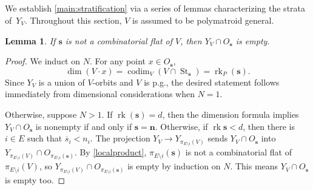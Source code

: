 \documentclass[11pt]{article}
\newtheorem{lemm}[theo]{Lemma}
\theoremstyle{definition}
\numberwithin{equation}{section}
\DeclareMathOperator{\St}{St}
\DeclareMathOperator{\rk}{rk}
\DeclareMathOperator{\codim}{codim}
\begin{document}
\subsection{}\label{geomproofs}
We establish \cref{main:stratification} via a series of lemmas characterizing the strata of~$Y_V$.
Throughout this section, $V$ is assumed to be polymatroid general.
\begin{lemm}\label{avoidance}
  If $\mathbf s$ is not a combinatorial flat of $V$, then $Y_V \cap O_{\mathbf s}$ is empty.
\end{lemm}
\begin{proof}
  We induct on $N$.
  For any point $x \in O_{\mathbf s}$,
  \begin{equation}
    \label{dimformula}\tag{$*$}
    \dim(V \cdot x) = \codim_V(V \cap \St_{\mathbf s}) = \rk_P(\mathbf s).
  \end{equation}
  Since $Y_V$ is a union of $V$-orbits and $V$ is p.g., the desired statement follows immediately from dimensional considerations when $N=1$.

  Otherwise, suppose $N > 1$.
  If $\rk(\mathbf s) = d$, then the dimension formula implies $Y_V \cap O_{\mathbf s}$ is nonempty if and only if $\mathbf s = \mathbf n$.
  Otherwise, if $\rk \mathbf s < d$, then there is $i \in E$ such that  $\overline{s}_i < n_i$.
  The projection $Y_V \to Y_{\pi_{E \setminus i}(V)}$ sends $Y_V \cap O_{\mathbf s}$ into $Y_{\pi_{E \setminus i}(V)} \cap O_{\pi_{E \setminus i}(\mathbf s)}$.
  By \cref{localproduct}, $\pi_{E \setminus i}(\mathbf s)$ is not a combinatorial flat of $\pi_{E \setminus i}(V)$, so  $Y_{\pi_{E \setminus i}(V)} \cap O_{\pi_{E \setminus i}(\mathbf s)}$ is empty by induction on $N$. This means $Y_V \cap O_{\mathbf s}$ is empty too.
\end{proof}
\end{document}
